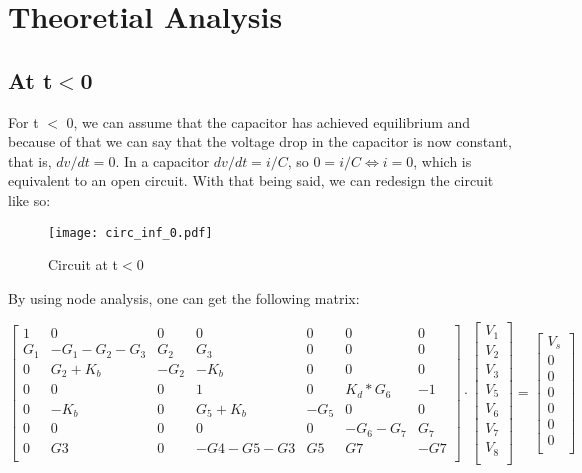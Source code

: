 \section{Theoretial Analysis}
\label{sec:theoretical analysis}
\subsection{At t$<$0}





For t $<$ 0, we can assume that the capacitor has achieved equilibrium and because of that we can say that the voltage drop in the capacitor is now constant, that is, $dv/dt = 0$.
In a capacitor $dv/dt = i/C$, so $0 = i/C \iff i = 0$, which is equivalent to an open circuit.
With that being said, we can redesign the circuit like so:

\begin{figure}[h!]
   \texttt{[image: circ\_inf\_0.pdf]}
    \centering
    \caption{Circuit at t$<$0} 
    \label{t<0}
\end{figure}

By using node analysis, one can get the following matrix:

\[
\begin{bmatrix}
1 & 0 & 0 & 0 & 0 & 0 & 0\\
G_1 & -G_1-G_2-G_3 & G_2 & G_3 &  0 & 0 & 0\\
0 & G_2+K_b & -G_2 & -K_b & 0 & 0 & 0\\
0 & 0 & 0 & 1 & 0 & K_d*G_6 & -1\\
0 & -K_b & 0 & G_5+K_b & -G_5 & 0 & 0\\
0 & 0 & 0 & 0 & 0 & -G_6 - G_7 & G_7\\
0 & G3 & 0 & -G4-G5-G3 & G5 & G7 & -G7\\
\end{bmatrix}
\cdot
\begin{bmatrix}
V_1\\
V_2\\
V_3\\
V_5\\
V_6\\
V_7\\
V_8\\
\end{bmatrix}
=
\begin{bmatrix}
V_s\\
0\\
0\\
0\\
0\\
0\\
0\\
\end{bmatrix}
\]

